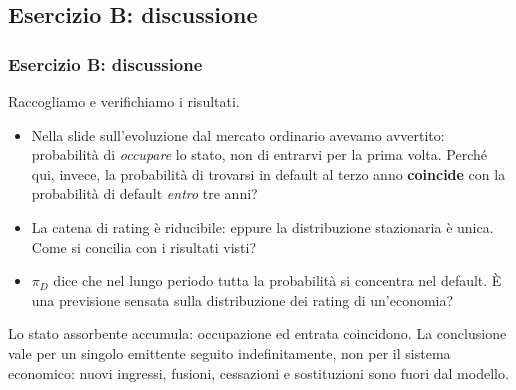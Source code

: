 \documentclass[handout]{beamer}%
\newenvironment{stepitemize}{\begin{itemize}[<+->]}{\end{itemize} }
\providecommand{\QTR}[2]{\csname #1\endcsname{#2}}
\begin{document}


\subsection{Esercizio B: discussione}%

\begin{frame}%
%

\frametitle{Esercizio B: discussione}%
%

%


Raccogliamo e verifichiamo i risultati.

\medskip

\begin{stepitemize}


\item Nella slide sull'evoluzione dal mercato ordinario avevamo avvertito:
probabilit\`{a} di \emph{occupare} lo stato, non di entrarvi per la prima
volta. Perch\'{e} qui, invece, la probabilit\`{a} di trovarsi in default al
terzo anno \textbf{coincide} con la probabilit\`{a} di default \emph{entro}
tre anni?

\item La catena di rating \`{e} riducibile: eppure la distribuzione
stazionaria \`{e} unica. Come si concilia con i risultati visti?

\item $\pi_{D}$ dice che nel lungo periodo tutta la probabilit\`{a} si
concentra nel default. \`{E} una previsione sensata sulla distribuzione dei
rating di un'economia?
\end{stepitemize}

\medskip

\begin{center}
{\small Lo stato assorbente accumula: occupazione ed entrata coincidono. La
conclusione vale per un singolo emittente seguito indefinitamente, non per il
sistema economico: nuovi ingressi, fusioni, cessazioni e sostituzioni sono
fuori dal modello.}
\end{center}%

\transboxout
\end{frame}%
\end{document}
